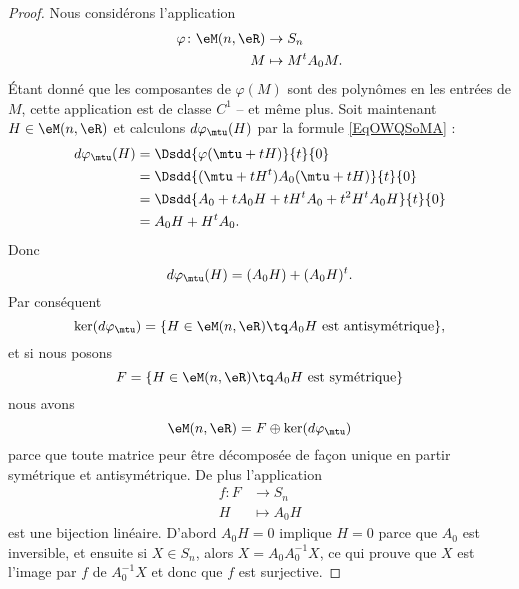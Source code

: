 \begin{proof}
    Nous considérons l'application
    \begin{equation}
        \begin{aligned}
            \varphi\colon \eM(n,\eR)&\to S_n \\
            M&\mapsto M^tA_0M. 
        \end{aligned}
    \end{equation}
    Étant donné que les composantes de \( \varphi(M)\) sont des polynômes en les entrées de \( M\), cette application est de classe \( C^1\) -- et même plus. Soit maintenant \( H\in \eM(n,\eR)\) et calculons \( d\varphi_{\mtu}(H)\) par la formule \eqref{EqOWQSoMA} :
    \begin{subequations}
        \begin{align}
            d\varphi_{\mtu}(H)&=\Dsdd{ \varphi(\mtu+tH) }{t}{0}\\
            &=\Dsdd{ (\mtu+tH^t)A_0(\mtu+tH) }{t}{0}\\
            &=\Dsdd{ A_0+tA_0H+tH^tA_0+t^2H^tA_0H }{t}{0}\\
            &=A_0H+H^tA_0.
        \end{align}
    \end{subequations}
    Donc
    \begin{equation}
        d\varphi_{\mtu}(H)=(A_0H)+(A_0H)^t.
    \end{equation}
    Par conséquent 
    \begin{equation}
        \ker(d\varphi_{\mtu})=\{ H\in \eM(n,\eR)\tq A_0H\text{ est antisymétrique} \},
    \end{equation}
    et si nous posons
    \begin{equation}
        F=\{ H\in \eM(n,\eR)\tq A_0H\text{ est symétrique} \}
    \end{equation}
    nous avons
    \begin{equation}
        \eM(n,\eR)=F\oplus\ker(d\varphi_{\mtu})
    \end{equation}
    parce que toute matrice peur être décomposée de façon unique en partir symétrique et antisymétrique. De plus l'application
    \begin{equation}    \label{EqGTBusDm}
        \begin{aligned}
            f\colon F&\to S_n \\
            H&\mapsto A_0H 
        \end{aligned}
    \end{equation}
    est une bijection linéaire. D'abord \( A_0H=0\) implique \( H=0\) parce que \( A_0\) est inversible, et ensuite si \( X\in S_n\), alors \( X=A_0A_0^{-1}X\), ce qui prouve que \( X\) est l'image par \( f\) de \( A_0^{-1}X\) et donc que \( f\) est surjective.


\end{proof}
